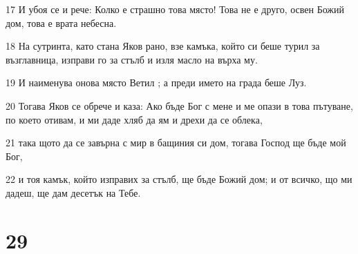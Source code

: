 \par 17 И убоя се и рече: Колко е страшно това място! Това не е друго, освен Божий дом, това е врата небесна.
\par 18 На сутринта, като стана Яков рано, взе камъка, който си беше турил за възглавница, изправи го за стълб и изля масло на върха му.
\par 19 И наименува онова място Ветил ; а преди името на града беше Луз.
\par 20 Тогава Яков се обрече и каза: Ако бъде Бог с мене и ме опази в това пътуване, по което отивам, и ми даде хляб да ям и дрехи да се облека,
\par 21 така щото да се завърна с мир в бащиния си дом, тогава Господ ще бъде мой Бог,
\par 22 и тоя камък, който изправих за стълб, ще бъде Божий дом; и от всичко, що ми дадеш, ще дам десетък на Тебе.

\chapter{29}

